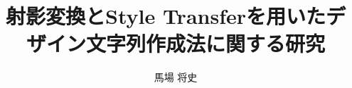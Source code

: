 \documentclass[autodetect-engine,dvi=dvipdfmx,ja=standard,a4j,jbase=10.5pt,twoside,twocolumn,magstyle=nomag*]{bxjsarticle}
\title{射影変換とStyle Transferを用いたデザイン文字列作成法に関する研究}
\author{馬場 将史}
\date{}
\begin{document}
\maketitle

\begin{thebibliography}{9}

\end{thebibliography}
\end{document}
